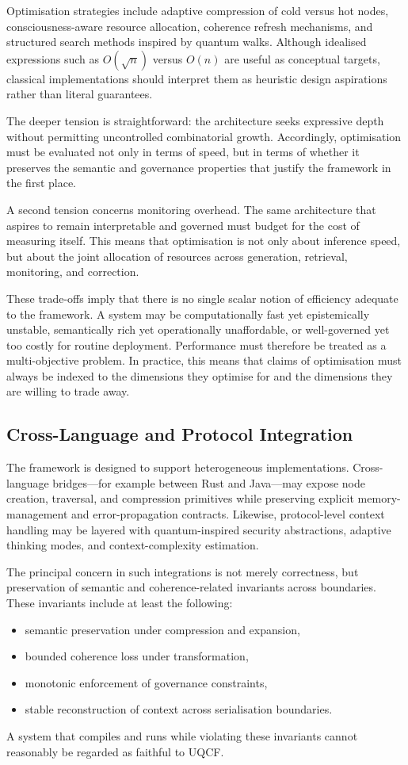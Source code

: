 \documentclass[12pt]{article}
\begin{document}
Optimisation strategies include adaptive compression of cold versus hot nodes, consciousness-aware resource allocation, coherence refresh mechanisms, and structured search methods inspired by quantum walks. Although idealised expressions such as $O(\sqrt{n})$ versus $O(n)$ are useful as conceptual targets, classical implementations should interpret them as heuristic design aspirations rather than literal guarantees.

The deeper tension is straightforward: the architecture seeks expressive depth without permitting uncontrolled combinatorial growth. Accordingly, optimisation must be evaluated not only in terms of speed, but in terms of whether it preserves the semantic and governance properties that justify the framework in the first place.

A second tension concerns monitoring overhead. The same architecture that aspires to remain interpretable and governed must budget for the cost of measuring itself. This means that optimisation is not only about inference speed, but about the joint allocation of resources across generation, retrieval, monitoring, and correction.

These trade-offs imply that there is no single scalar notion of efficiency adequate to the framework. A system may be computationally fast yet epistemically unstable, semantically rich yet operationally unaffordable, or well-governed yet too costly for routine deployment. Performance must therefore be treated as a multi-objective problem. In practice, this means that claims of optimisation must always be indexed to the dimensions they optimise for and the dimensions they are willing to trade away.

\subsection{Cross-Language and Protocol Integration}
The framework is designed to support heterogeneous implementations. Cross-language bridges---for example between Rust and Java---may expose node creation, traversal, and compression primitives while preserving explicit memory-management and error-propagation contracts. Likewise, protocol-level context handling may be layered with quantum-inspired security abstractions, adaptive thinking modes, and context-complexity estimation.

The principal concern in such integrations is not merely correctness, but preservation of semantic and coherence-related invariants across boundaries. These invariants include at least the following:
\begin{itemize}[leftmargin=2em]
    \item semantic preservation under compression and expansion,
    \item bounded coherence loss under transformation,
    \item monotonic enforcement of governance constraints,
    \item stable reconstruction of context across serialisation boundaries.
\end{itemize}
A system that compiles and runs while violating these invariants cannot reasonably be regarded as faithful to UQCF.
\end{document}
